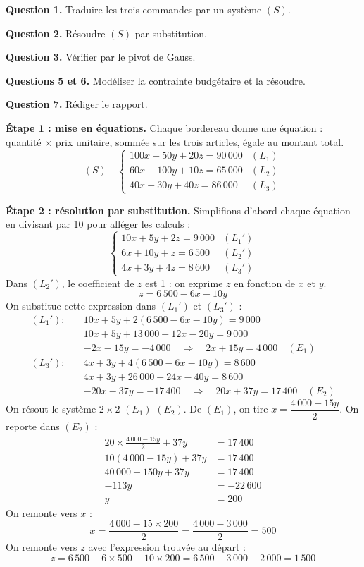 \documentclass[11pt]{article}
\begin{document}
\begin{exoresolu}
\textbf{Question 1.} Traduire les trois commandes par un système $(S)$.

\textbf{Question 2.} Résoudre $(S)$ par substitution.

\textbf{Question 3.} Vérifier par le pivot de Gauss.

\textbf{Questions 5 et 6.} Modéliser la contrainte budgétaire et la résoudre.

\textbf{Question 7.} Rédiger le rapport.

\tcblower

\textbf{Étape 1 : mise en équations.} Chaque bordereau donne une équation : quantité $\times$ prix unitaire, sommée sur les trois articles, égale au montant total.
\[
(S)\quad \begin{cases}
100x + 50y + 20z = 90\,000 & (L_1)\\
60x + 100y + 10z = 65\,000 & (L_2)\\
40x + 30y + 40z = 86\,000 & (L_3)
\end{cases}
\]

\textbf{Étape 2 : résolution par substitution.} Simplifions d'abord chaque équation en divisant par 10 pour alléger les calculs :
\[
\begin{cases}
10x + 5y + 2z = 9\,000 & (L_1')\\
6x + 10y + z = 6\,500 & (L_2')\\
4x + 3y + 4z = 8\,600 & (L_3')
\end{cases}
\]
Dans $(L_2')$, le coefficient de $z$ est 1 : on exprime $z$ en fonction de $x$ et $y$.
\[
z = 6\,500 - 6x - 10y
\]
On substitue cette expression dans $(L_1')$ et $(L_3')$ :
\begin{align*}
(L_1') : \quad & 10x + 5y + 2(6\,500 - 6x - 10y) = 9\,000 \\
& 10x + 5y + 13\,000 - 12x - 20y = 9\,000 \\
& -2x - 15y = -4\,000 \quad \Longrightarrow \quad 2x + 15y = 4\,000 \quad (E_1)\\[4pt]
(L_3') : \quad & 4x + 3y + 4(6\,500 - 6x - 10y) = 8\,600 \\
& 4x + 3y + 26\,000 - 24x - 40y = 8\,600 \\
& -20x - 37y = -17\,400 \quad \Longrightarrow \quad 20x + 37y = 17\,400 \quad (E_2)
\end{align*}
On résout le système $2\times 2$ $(E_1)$-$(E_2)$. De $(E_1)$, on tire $x = \dfrac{4\,000 - 15y}{2}$. On reporte dans $(E_2)$ :
\begin{align*}
20 \times \frac{4\,000 - 15y}{2} + 37y &= 17\,400 \\
10(4\,000 - 15y) + 37y &= 17\,400 \\
40\,000 - 150y + 37y &= 17\,400 \\
-113y &= -22\,600 \\
y &= 200
\end{align*}
On remonte vers $x$ :
\[
x = \frac{4\,000 - 15 \times 200}{2} = \frac{4\,000 - 3\,000}{2} = 500
\]
On remonte vers $z$ avec l'expression trouvée au départ :
\[
z = 6\,500 - 6 \times 500 - 10 \times 200 = 6\,500 - 3\,000 - 2\,000 = 1\,500
\]


\end{exoresolu}
\end{document}
